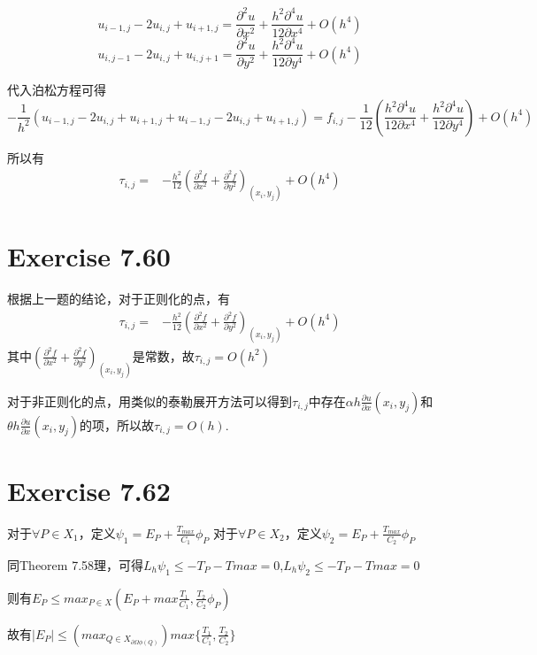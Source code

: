 \documentclass{article}
\begin{document}
$$
u_{i-1,j}-2u_{i,j}+u_{i+1,j}=\frac{\partial^2u}{\partial x^2}+\frac{h^2\partial^4u}{12\partial x^4}+O(h^4)
$$
$$
u_{i,j-1}-2u_{i,j}+u_{i,j+1}=\frac{\partial^2u}{\partial y^2}+\frac{h^2\partial^4u}{12\partial y^4}+O(h^4)
$$

代入泊松方程可得
$$
-\frac{1}{h^2}(u_{i-1,j}-2u_{i,j}+u_{i+1,j}+u_{i-1,j}-2u_{i,j}+u_{i+1,j})=f_{i,j}-\frac{1}{12}(\frac{h^2\partial^4u}{12\partial x^4}+\frac{h^2\partial^4u}{12\partial y^4})+O(h^4)
$$

所以有
\begin{align*}
    \tau_{i,j} =
    &-\frac{h^2}{12}\left(\frac{\partial^2 f}{\partial x^2}+\frac{\partial^2 f}{\partial y^2}\right)_{(x_i,y_j)}+O(h^4)
    \end{align*}

\section{Exercise 7.60}
根据上一题的结论，对于正则化的点，有\begin{align*}
    \tau_{i,j} =
    &-\frac{h^2}{12}\left(\frac{\partial^2 f}{\partial x^2}+\frac{\partial^2 f}{\partial y^2}\right)_{(x_i,y_j)}+O(h^4)
    \end{align*}
其中$\left(\frac{\partial^2 f}{\partial x^2}+\frac{\partial^2 f}{\partial y^2}\right)_{(x_i,y_j)}$是常数，故$\tau_{i,j}=O(h^2)$

对于非正则化的点，用类似的泰勒展开方法可以得到$\tau_{i,j}$中存在$\alpha h\frac{\partial u}{\partial x}(x_i,y_j)$和$\theta h\frac{\partial u}{\partial x}(x_i,y_j)$的项，所以故$\tau_{i,j}=O(h)$.
\section{Exercise 7.62}
对于$\forall P\in X_1$，定义$\psi_1=E_P+\frac{T_{max}}{C_1}\phi_P$
对于$\forall P\in X_2$，定义$\psi_2=E_P+\frac{T_{max}}{C_2}\phi_P$

同Theorem 7.58理，可得$L_h\psi_1\le -T_P-T{max}=0$,$L_h\psi_2\le -T_P-T{max}=0$

则有$E_P\le max_{P\in X}(E_P+max{\frac{T_1}{C_1},\frac{T_2}{C_2}}\phi_P)$

故有$|E_P|\le(max_{Q\in X_{\partial \Omega \phi(Q)}})max\{\frac{T_1}{C_1},\frac{T_2}{C_2}\}$
\end{document}
